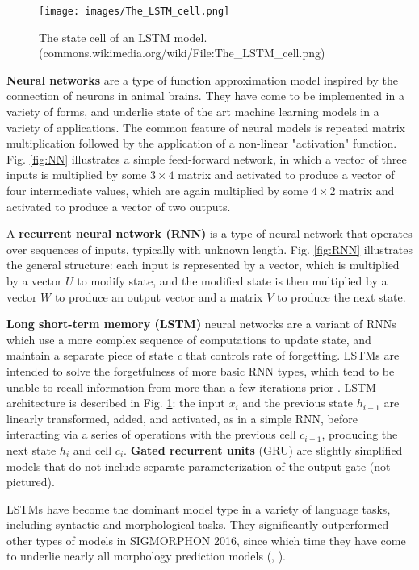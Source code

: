 \begin{figure}[p]
\texttt{[image: images/The\_LSTM\_cell.png]}
\centering
\caption{The state cell of an LSTM model. \\ (commons.wikimedia.org/wiki/File:The\_LSTM\_cell.png)}
\label{fig:LSTM}
\end{figure}

\textbf{Neural networks} are a type of function approximation model inspired by the connection of neurons in animal brains. They have come to be implemented in a variety of forms, and underlie state of the art machine learning models in a variety of applications. The common feature of neural models is repeated matrix multiplication followed by the application of a non-linear "activation" function. Fig. \ref{fig:NN} illustrates a simple feed-forward network, in which a vector of three inputs is multiplied by some $3 \times 4$ matrix and activated to produce a vector of four intermediate values, which are again multiplied by some $4 \times 2$ matrix and activated to produce a vector of two outputs.

A \textbf{recurrent neural network (RNN)} is a type of neural network that operates over sequences of inputs, typically with unknown length. Fig. \ref{fig:RNN} illustrates the general structure: each input is represented by a vector, which is multiplied by a vector $U$ to modify state, and the modified state is then multiplied by a vector $W$ to produce an output vector and a matrix $V$ to produce the next state. 

\textbf{Long short-term memory (LSTM)} neural networks are a variant of RNNs which use a more complex sequence of computations to update state, and maintain a separate piece of state \textit{c} that controls rate of forgetting. LSTMs are intended to solve the forgetfulness of more basic RNN types, which tend to be unable to recall information from more than a few iterations prior \parencite{Hochreiter1997}. LSTM architecture is described in Fig. \ref{fig:LSTM}: the input $x_i$ and the previous state $h_{i-1}$ are linearly transformed, added, and activated, as in a simple RNN, before interacting via a series of operations with the previous cell $c_{i-1}$, producing the next state $h_i$ and cell $c_i$. \textbf{Gated recurrent units} (GRU) are slightly simplified models that do not include separate parameterization of the output gate (not pictured).

LSTMs have become the dominant model type in a variety of language tasks, including syntactic and morphological tasks. They significantly outperformed other types of models in SIGMORPHON 2016, since which time they have come to underlie nearly all morphology prediction models (\cite{Cotterell2016}, \cite{Cotterell2017a}).

